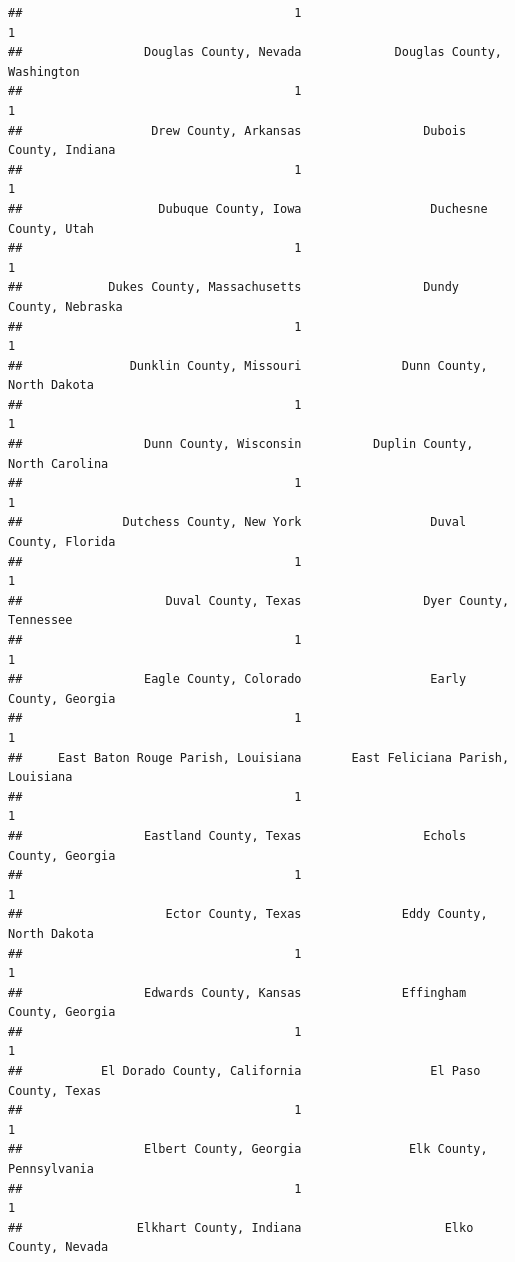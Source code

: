 \documentclass[
]{article}
\begin{document}
\begin{verbatim}
##                                      1                                      1 
##                 Douglas County, Nevada             Douglas County, Washington 
##                                      1                                      1 
##                  Drew County, Arkansas                 Dubois County, Indiana 
##                                      1                                      1 
##                   Dubuque County, Iowa                  Duchesne County, Utah 
##                                      1                                      1 
##            Dukes County, Massachusetts                 Dundy County, Nebraska 
##                                      1                                      1 
##               Dunklin County, Missouri              Dunn County, North Dakota 
##                                      1                                      1 
##                 Dunn County, Wisconsin          Duplin County, North Carolina 
##                                      1                                      1 
##              Dutchess County, New York                  Duval County, Florida 
##                                      1                                      1 
##                    Duval County, Texas                 Dyer County, Tennessee 
##                                      1                                      1 
##                 Eagle County, Colorado                  Early County, Georgia 
##                                      1                                      1 
##     East Baton Rouge Parish, Louisiana       East Feliciana Parish, Louisiana 
##                                      1                                      1 
##                 Eastland County, Texas                 Echols County, Georgia 
##                                      1                                      1 
##                    Ector County, Texas              Eddy County, North Dakota 
##                                      1                                      1 
##                 Edwards County, Kansas              Effingham County, Georgia 
##                                      1                                      1 
##           El Dorado County, California                  El Paso County, Texas 
##                                      1                                      1 
##                 Elbert County, Georgia               Elk County, Pennsylvania 
##                                      1                                      1 
##                Elkhart County, Indiana                    Elko County, Nevada 

\end{verbatim}
\end{document}
